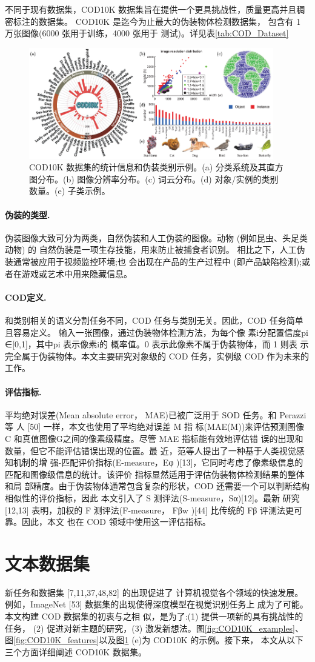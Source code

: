 \documentclass[final]{cvpr}
\newcommand{\mypara}[1]{\paragraph{#1.}}
\renewcommand{\figref}[1]{图\ref{#1}}
\renewcommand{\tabref}[1]{表\ref{#1}}
\begin{document}
不同于现有数据集，COD10K 数据集旨在提供一个更具挑战性，质量更高并且稠密标注的数据集。 COD10K 是迄今为止最大的伪装物体检测数据集， 包含有 1 万张图像(6000 张用于训练，4000 张用于 测试)。详见\tabref{tab:COD_Dataset}
\begin{figure}
    \centering
    \includegraphics[width=0.95\textwidth]{COD_Zh_translate/figures/Catagory_COD10k.png}\small
    \caption{COD10K 数据集的统计信息和伪装类别示例。(a) 分类系统及其直方图分布。(b) 图像分辨率分布。(c) 词云分布。(d) 对象/实例的类别数量。(e) 子类示例。}
    \label{fig:Catagory_COD10k}
\end{figure}
\mypara{伪装的类型}伪装图像大致可分为两类，自然伪装和人工伪装的图像。动物 (例如昆虫、头足类动物) 的 自然伪装是一项生存技能，用来防止被捕食者识别。 相比之下，人工伪装通常被应用于视频监控环境;也 会出现在产品的生产过程中 (即产品缺陷检测);或 者在游戏或艺术中用来隐藏信息。
\mypara{COD定义} 和类别相关的语义分割任务不同，COD 任务与类别无关。因此，COD 任务简单且容易定义。 输入一张图像，通过伪装物体检测方法，为每个像 素i分配置信度pi ∈[0,1]，其中pi 表示像素i的 概率值。0 表示此像素不属于伪装物体，而 1 则表 示完全属于伪装物体。本文主要研究对象级的 COD 任务，实例级 COD 作为未来的工作。
\mypara{评估指标}平均绝对误差(Mean absolute error， MAE)已被广泛用于 SOD 任务。和 Perazzi 等 人 [50] 一样，本文也使用了平均绝对误差 M 指 标(MAE(M))来评估预测图像 C 和真值图像G之间的像素级精度。尽管 MAE 指标能有效地评估错 误的出现和数量，但它不能评估错误出现的位置。最 近，范等人提出了一种基于人类视觉感知机制的增 强-匹配评价指标(E-measure，Eφ )[13]，它同时考虑了像素级信息的匹配和图像级信息的统计。该评价 指标显然适用于评估伪装物体检测结果的整体和局 部精度。由于伪装物体通常包含复杂的形状，COD 还需要一个可以判断结构相似性的评价指标，因此 本文引入了 S 测评法(S-measure，Sα)[12]。最新 研究 [12,13] 表明，加权的 F 测评法(F-measure， Fβw )[44] 比传统的 Fβ 评测法更可靠。因此，本文 也在 COD 领域中使用这一评估指标。
\section{文本数据集}\label{sec:Our_Dataset}
新任务和数据集 [7,11,37,48,82] 的出现促进了 计算机视觉各个领域的快速发展。例如，ImageNet [53] 数据集的出现使得深度模型在视觉识别任务上 成为了可能。本文构建 COD 数据集的初衷与之相 似，是为了:(1) 提供一项新的具有挑战性的任务， (2) 促进对新主题的研究，(3) 激发新想法。\figref{fig:COD10K_examples}、\figref{fig:COD10K_features}以及\figref{fig:Catagory_COD10k} (e)为 COD10K 的示例。接下来， 本文从以下三个方面详细阐述 COD10K 数据集。
\end{document}
